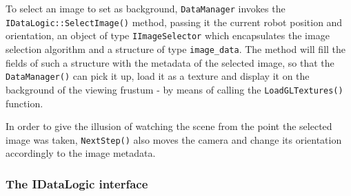 %
To select an image to set as background, \texttt{DataManager} 
invokes the \\
\texttt{IDataLogic::SelectImage()} method, 
passing it the current robot position and orientation, 
an object of type \texttt{IImageSelector} which 
encapsulates the image selection algorithm and a structure 
of type \texttt{image\_data}.
%
The method will fill the fields of such a structure with 
the metadata of the selected image, so that the 
\texttt{DataManager()} can pick it up, load it as a 
texture and display it on the background of the 
viewing frustum - by means of calling the 
\texttt{LoadGLTextures()} function.
%

%
In order to give the illusion of watching the scene 
from the point the selected image was taken, 
\texttt{NextStep()} also moves the camera and change 
its orientation accordingly to the image metadata.
%

\subsubsection{The IDataLogic interface}
\label{sub:idatalogic}


